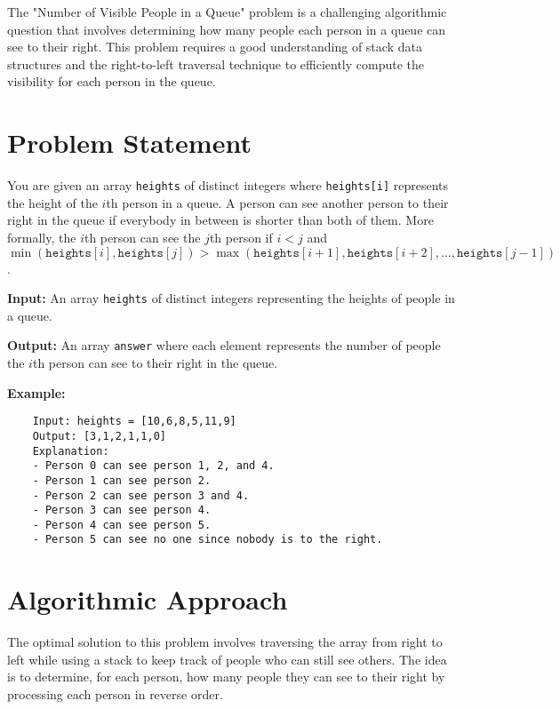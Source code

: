 \label{problem:Number_of_Visible_People_in_a_Queue}

The "Number of Visible People in a Queue" problem is a challenging algorithmic question that involves determining how many people each person in a queue can see to their right. This problem requires a good understanding of stack data structures and the right-to-left traversal technique to efficiently compute the visibility for each person in the queue.

\section*{Problem Statement}

You are given an array \texttt{heights} of distinct integers where \texttt{heights[i]} represents the height of the \(i\)th person in a queue. A person can see another person to their right in the queue if everybody in between is shorter than both of them. More formally, the \(i\)th person can see the \(j\)th person if \(i < j\) and \(\min(\texttt{heights}[i], \texttt{heights}[j]) > \max(\texttt{heights}[i+1], \texttt{heights}[i+2], ..., \texttt{heights}[j-1])\).

\textbf{Input:} An array \texttt{heights} of distinct integers representing the heights of people in a queue.

\textbf{Output:} An array \texttt{answer} where each element represents the number of people the \(i\)th person can see to their right in the queue.

\textbf{Example:}
\begin{verbatim}
    Input: heights = [10,6,8,5,11,9]
    Output: [3,1,2,1,1,0]
    Explanation: 
    - Person 0 can see person 1, 2, and 4.
    - Person 1 can see person 2.
    - Person 2 can see person 3 and 4.
    - Person 3 can see person 4.
    - Person 4 can see person 5.
    - Person 5 can see no one since nobody is to the right.
\end{verbatim}


\section*{Algorithmic Approach}

The optimal solution to this problem involves traversing the array from right to left while using a stack to keep track of people who can still see others. The idea is to determine, for each person, how many people they can see to their right by processing each person in reverse order.

